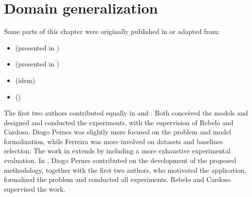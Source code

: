 
\chapter{Domain generalization}


\label{chp:domain_generalization}


\begin{tcolorbox}
    \small{
    Some parts of this chapter were originally published in or adapted from:
    \begin{itemize}
        \item[] \cite{DeSIRe}  (presented in )
        \item[] \cite{AdvSInvConf}  (presented in )
        \item[] \cite{AdvSInvJournal}  (idem)
        \item[] \cite{AdvInvAttack}  ()
    \end{itemize}

    The first two authors contributed equally in \cite{DeSIRe} and \cite{AdvSInvConf}. Both conceived the models and designed and conducted the experiments, with the supervision of Rebelo and Cardoso. Diogo Pernes was slightly more focused on the problem and model formalization, while Ferreira was more involved on datasets and baselines selection. The work in \cite{AdvSInvJournal} extends \cite{AdvSInvConf} by including a more exhaustive experimental evaluation. In \cite{AdvInvAttack}, Diogo Pernes contributed on the development of the proposed methodology, together with the first two authors, who motivated the application, formalized the problem and conducted all experiments. Rebelo and Cardoso supervised the work.
    }
\end{tcolorbox}

